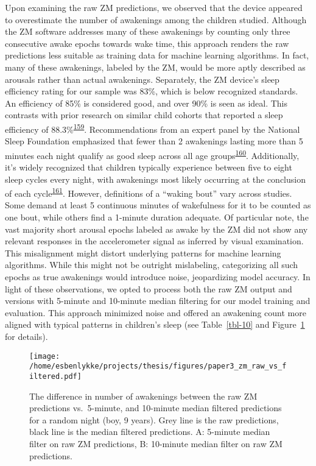 \documentclass[
  10pt,
]{scrbook}
\begin{document}
\endgroup

Upon examining the raw ZM predictions, we observed that the device
appeared to overestimate the number of awakenings among the children
studied. Although the ZM software addresses many of these awakenings by
counting only three consecutive awake epochs towards wake time, this
approach renders the raw predictions less suitable as training data for
machine learning algorithms. In fact, many of these awakenings, labeled
by the ZM, would be more aptly described as arousals rather than actual
awakenings. Separately, the ZM device's sleep efficiency rating for our
sample was 83\%, which is below recognized standards. An efficiency of
85\% is considered good, and over 90\% is seen as ideal. This contrasts
with prior research on similar child cohorts that reported a sleep
efficiency of
88.3\%\textsuperscript{\protect\hyperlink{ref-galland_2018}{159}}.
Recommendations from an expert panel by the National Sleep Foundation
emphasized that fewer than 2 awakenings lasting more than 5 minutes each
night qualify as good sleep across all age
groups\textsuperscript{\protect\hyperlink{ref-ohayon_2017}{160}}.
Additionally, it's widely recognized that children typically experience
between five to eight sleep cycles every night, with awakenings most
likely occurring at the conclusion of each
cycle\textsuperscript{\protect\hyperlink{ref-galland_normal_2012}{161}}.
However, definitions of a ``waking bout'' vary across studies. Some
demand at least 5 continuous minutes of wakefulness for it to be counted
as one bout, while others find a 1-minute duration adequate. Of
particular note, the vast majority short arousal epochs labeled as awake
by the ZM did not show any relevant responses in the accelerometer
signal as inferred by visual examination. This misalignment might
distort underlying patterns for machine learning algorithms. While this
might not be outright mislabeling, categorizing all such epochs as true
awakenings would introduce noise, jeopardizing model accuracy. In light
of these observations, we opted to process both the raw ZM output and
versions with 5-minute and 10-minute median filtering for our model
training and evaluation. This approach minimized noise and offered an
awakening count more aligned with typical patterns in children's sleep
(see Table~\ref{tbl-10} and Figure~\ref{fig-paper3_raw_filt} for
details).

\begin{figure}

{\centering \texttt{[image: /home/esbenlykke/projects/thesis/figures/paper3\_zm\_raw\_vs\_filtered.pdf]}

}

\caption{\label{fig-paper3_raw_filt}The difference in number of
awakenings between the raw ZM predictions vs.~5-minute, and 10-minute
median filtered predictions for a random night (boy, 9 years). Grey line
is the raw predictions, black line is the median filtered predictions.
A: 5-minute median filter on raw ZM predictions, B: 10-minute median
filter on raw ZM predictions.}

\end{figure}
\end{document}
